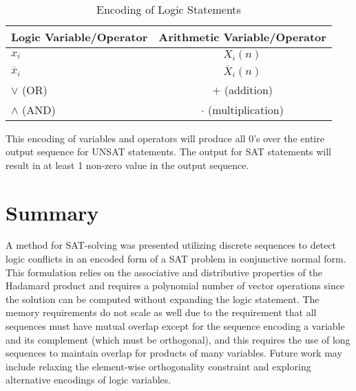 \documentclass[reqno]{amsart}
\theoremstyle{definition}
\theoremstyle{remark}
\begin{document}
\begin{table}[h]
\centering
\def\arraystretch{1.2}
\begin{tabular}{|l|c|}
\hline
Logic Variable/Operator & Arithmetic Variable/Operator \\
\hline
$x_i$ & $X_i(n)$ \\
\hline
$\overline{x}_i$ & $\overline{X}_i(n)$ \\
\hline
$\vee $ (OR) & $+$ (addition) \\
\hline
$\wedge $ (AND) & $\cdot$ (multiplication) \\
\hline
\end{tabular}
\caption{Encoding of Logic Statements}
\label{tab:template}
\end{table}

\noindent
This encoding of variables and operators will produce all 0's over the entire output sequence 
for UNSAT statements. The output for SAT statements will result in at least 1 non-zero value 
in the output sequence.


\pagebreak
\section{Summary}
\noindent
A method for SAT-solving was presented utilizing discrete sequences to detect logic conflicts in an encoded form of a SAT problem in conjunctive normal form. This formulation relies on the associative and distributive properties of the Hadamard product and requires a polynomial number of vector operations since the solution can be computed without expanding the logic statement. The memory requirements do not scale as well due to the requirement that all sequences must have mutual overlap except for the sequence encoding a variable and its complement (which must be orthogonal), and this requires the use of long sequences to maintain overlap for products of many variables. Future work may include relaxing the element-wise orthogonality constraint and exploring alternative encodings of logic variables.




\end{document}
